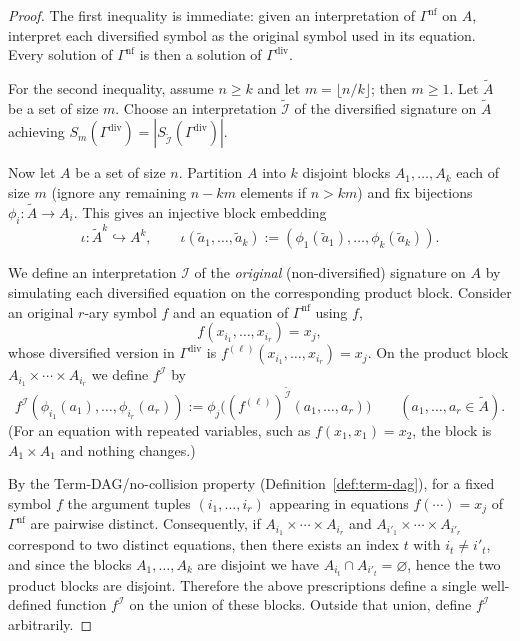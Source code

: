 \documentclass[11pt]{article}
\theoremstyle{plain}
\theoremstyle{definition}
\theoremstyle{definition}
\theoremstyle{remark}
\newcommand{\A}{A}
\newcommand{\abs}[1]{\left\lvert #1 \right\rvert}
\begin{document}
\begin{proof}
The first inequality is immediate: given an interpretation of $\Gamma^{\mathrm{nf}}$ on $\A$,
interpret each diversified symbol as the original symbol used in its equation.
Every solution of $\Gamma^{\mathrm{nf}}$ is then a solution of $\Gamma^{\mathrm{div}}$.

For the second inequality, assume $n\ge k$ and let $m=\lfloor n/k\rfloor$; then $m\ge 1$.
Let $\tilde\A$ be a set of size $m$.
Choose an interpretation $\tilde{\mathcal I}$ of the diversified signature on $\tilde\A$ achieving
$S_m(\Gamma^{\mathrm{div}})=\abs{S_{\tilde{\mathcal I}}(\Gamma^{\mathrm{div}})}$.

Now let $\A$ be a set of size $n$.
Partition $\A$ into $k$ disjoint blocks $\A_1,\dots,\A_k$ each of size $m$ (ignore any remaining
$n-km$ elements if $n>km$) and fix bijections $\phi_i:\tilde\A\to \A_i$.
This gives an injective block embedding
\[
  \iota:\tilde\A^k\hookrightarrow \A^k,\qquad
  \iota(\tilde a_1,\dots,\tilde a_k):=(\phi_1(\tilde a_1),\dots,\phi_k(\tilde a_k)).
\]

We define an interpretation $\mathcal I$ of the \emph{original} (non-diversified) signature on $\A$ by
simulating each diversified equation on the corresponding product block.
Consider an original $r$-ary symbol $f$ and an equation of $\Gamma^{\mathrm{nf}}$ using $f$,
\[
  f(x_{i_1},\dots,x_{i_r})=x_j,
\]
whose diversified version in $\Gamma^{\mathrm{div}}$ is
\( f^{(\ell)}(x_{i_1},\dots,x_{i_r})=x_j\).
On the product block $\A_{i_1}\times\cdots\times\A_{i_r}$ we define $f^{\mathcal I}$ by
\[
  f^{\mathcal I}(\phi_{i_1}(a_1),\dots,\phi_{i_r}(a_r))
  :=\phi_j\bigl( (f^{(\ell)})^{\tilde{\mathcal I}}(a_1,\dots,a_r)\bigr)
  \qquad (a_1,\dots,a_r\in\tilde\A).
\]
(For an equation with repeated variables, such as $f(x_1,x_1)=x_2$, the block is
$\A_1\times\A_1$ and nothing changes.)

By the Term-DAG/no-collision property (Definition~\ref{def:term-dag}), for a fixed symbol $f$ the argument tuples
$(i_1,\dots,i_r)$ appearing in equations $f(\cdots)=x_j$ of $\Gamma^{\mathrm{nf}}$ are pairwise distinct.
Consequently, if $\A_{i_1}\times\cdots\times\A_{i_r}$ and $\A_{i'_1}\times\cdots\times\A_{i'_r}$ correspond to two distinct equations,
then there exists an index $t$ with $i_t\neq i'_t$, and since the blocks $\A_1,\dots,\A_k$ are disjoint we have
$\A_{i_t}\cap\A_{i'_t}=\varnothing$, hence the two product blocks are disjoint.
Therefore the above prescriptions define a single well-defined function
$f^{\mathcal I}$ on the union of these blocks.
Outside that union, define $f^{\mathcal I}$ arbitrarily.


\end{proof}
\end{document}
